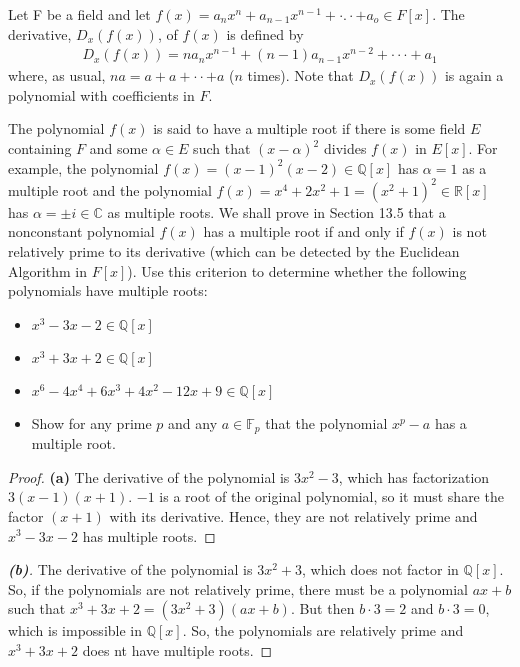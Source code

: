 \documentclass[10pt]{article}
\newenvironment{problem}[2][Problem]{\begin{trivlist}
		\item[\hskip \labelsep {\bfseries #1}\hskip \labelsep {\bfseries #2.}]}{\end{trivlist}}
\begin{document}
	\begin{problem}{4.19}
		Let F be a field and let $f(x) = a_nx^n + a_{n-1}x^{n-1} + ·.· + a_o \in F[x]$. The derivative, $D_x(f(x))$, of $f(x)$ is defined by
		\begin{align*}
			D_x(f(x)) = na_nx^{n-1} + (n-1)a_{n- 1}x^{n -2} + ··· + a_1
		\end{align*}
		where, as usual, $na = a + a + · · + a$ ($n$ times). Note that $D_x(f(x))$ is again a polynomial with coefficients in $F$. 
		
		The polynomial $f(x)$ is said to have a multiple root if there is some field $E$ containing $F$ and some $\alpha \in E$ such that $(x - \alpha)^2$ divides $f(x)$ in $E[x]$. For example, the polynomial $f(x) = (x - 1)^2(x - 2) \in \mathbb{Q}[x]$ has $\alpha = 1$ as a multiple root and the polynomial $f(x) = x^4 + 2x^2 + 1 = (x^2 + 1 )^2 \in \mathbb{R}[x]$ has $\alpha = \pm i \in \mathbb{C}$ as multiple roots. We shall prove in Section 13.5 that a nonconstant polynomial $f(x)$ has a multiple root if and only if $f(x)$ is not relatively prime to its derivative (which can be detected by the Euclidean Algorithm in $F[x]$). Use this criterion to determine whether the following polynomials have multiple roots:
		\begin{itemize}
			\item[\textbf{(a)}] $x^3 - 3x - 2 \in \mathbb{Q}[x]$
			\item[\textbf{(b)}] $x^3 + 3x + 2 \in \mathbb{Q}[x]$
			\item[\textbf{(c)}] $x^6 - 4x^4 + 6x^3 + 4x^2 - 12x + 9 \in \mathbb{Q}[x]$
			\item[\textbf{(d)}] Show for any prime $p$ and any $a \in \mathbb{F}_p$ that the polynomial $x^p - a$ has a multiple root.
		\end{itemize}
		\begin{proof}{\textbf{(a)}}
			The derivative of the polynomial is $3x^2-3$, which has factorization $3(x-1)(x+1)$. $-1$ is a root of the original polynomial, so it must share the factor $(x+1)$ with its derivative. Hence, they are not relatively prime and $x^3 - 3x - 2$ has multiple roots.
		\end{proof}
		
		\begin{proof}[\textbf{(b)}]
			The derivative of the polynomial is $3x^2 + 3$, which does not factor in $\mathbb{Q}[x]$. So, if the polynomials are not relatively prime, there must be a polynomial $ax+b$ such that $x^3 + 3x + 2 = (3x^2 + 3)(ax+b)$. But then $b\cdot3 = 2$ and $b\cdot3=0$, which is impossible in $\mathbb{Q}[x]$. So, the polynomials are relatively prime and $x^3 + 3x + 2$ does nt have multiple roots.
		\end{proof}
		

\end{problem}
\end{document}
